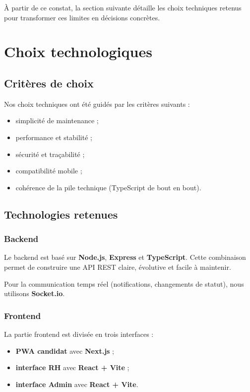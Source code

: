 À partir de ce constat, la section suivante détaille les choix techniques
retenus pour transformer ces limites en décisions concrètes.

\section{Choix technologiques}

\subsection{Critères de choix}

Nos choix techniques ont été guidés par les critères suivants :
\begin{itemize}
    \item simplicité de maintenance ;
    \item performance et stabilité ;
    \item sécurité et traçabilité ;
    \item compatibilité mobile ;
    \item cohérence de la pile technique (TypeScript de bout en bout).
\end{itemize}

\subsection{Technologies retenues}

\subsubsection{Backend}

Le backend est basé sur \textbf{Node.js}, \textbf{Express} et
\textbf{TypeScript}. Cette combinaison permet de construire une API REST
claire, évolutive et facile à maintenir.

Pour la communication temps réel (notifications, changements de statut),
nous utilisons \textbf{Socket.io}.

\subsubsection{Frontend}

La partie frontend est divisée en trois interfaces :
\begin{itemize}
    \item \textbf{PWA candidat} avec \textbf{Next.js} ;
    \item \textbf{interface RH} avec \textbf{React + Vite} ;
    \item \textbf{interface Admin} avec \textbf{React + Vite}.
\end{itemize}

